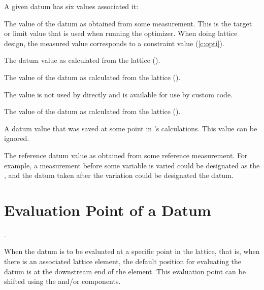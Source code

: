 A given datum has six values associated it:
\vspace{-2ex}
\begin{description}
  \vspace{-1ex}
  \item[meas] \Newline 
The value of the datum as obtained from some measurement. This is the
target or limit value that is used when running the optimizer. When
doing lattice design, the measured value corresponds to a constraint
value (\ref{c:opti}).
  \vspace{-1ex}
  \item[base] \Newline
The datum value as calculated from the  lattice ().
  \vspace{-0.5ex}
  \item[design] \Newline
The value of the datum as calculated from the  lattice ().
  \vspace{-0.5ex}
  \item[fit] \Newline
The  value is not used by \tao directly and is available for use by custom code.
  \vspace{-0.5ex}
  \item[model] \Newline
The value of the datum as calculated from the  lattice ().
  \vspace{-0.5ex}
  \item[old] \Newline
A datum value that was saved at some point in \tao's calculations. This value
can be ignored.
  \vspace{-0.5ex}
  \item[ref] \Newline
The reference datum value as obtained from some reference measurement. For example,
a measurement before some variable is varied could be designated as
the , and the datum taken after the variation could be 
designated the  datum.
\end{description}

\section{Evaluation Point of a Datum}.
\label{s:dat.eval}

When the datum is to be evaluated at a specific point in the lattice, that is, when there
is an associated lattice element, the default position for evaluating the datum is at the
downstream end of the element. This evaluation point can be shifted using the
 and/or  components. 

